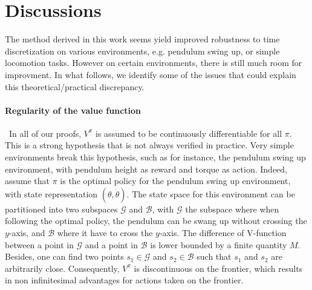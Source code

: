 \section{Discussions}
\label{sec:discussions}
The method derived in this work seems yield improved robustness to time discretization on 
various environments, e.g. pendulum swing up, or simple locomotion tasks.
However on certain environments, there is still much room for improvment. In what follows,
we identify some of the issues that could explain this theoretical/practical discrepancy.

\paragraph{Regularity of the value function}~In all of our proofs, $V^\pi$ is
assumed to be continuously differentiable for all $\pi$.  This is a strong
hypothesis that is not always verified in practice. Very simple environments
break this hypothesis, such as for instance, the pendulum swing up environment,
with pendulum height as reward and torque as action.  Indeed, assume that $\pi$
is the optimal policy for the pendulum swing up environment, with state
representation $(\theta, \dot{\theta})$. The state space for this environment
can be partitioned into two subspaces $\mathcal{G}$ and $\mathcal{B}$, with
$\mathcal{G}$ the subspace where when following the optimal policy, the
pendulum can be swang up without crossing the $y$-axis, and $\mathcal{B}$ where
it have to cross the $y$-axis. The difference of V-function between a point in
$\mathcal{G}$ and a point in $\mathcal{B}$ is lower bounded by a finite
quantity $M$. Besides, one can find two points $s_1 \in \mathcal{G}$ and $s_2 \in \mathcal{B}$
such that $s_1$ and $s_2$ are arbitrarily close. Consequently, $V^\pi$ is
discontinuous on the frontier, which results in non infinitesimal advantages
for actions taken on the frontier. 

